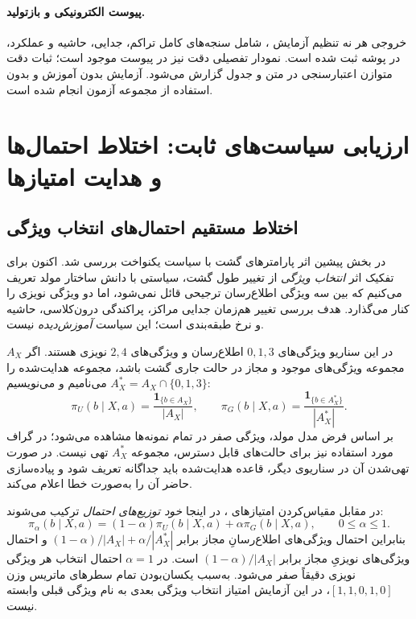 \paragraph{پیوست الکترونیکی و بازتولید.}
خروجی هر نه تنظیم آزمایش ، شامل سنجه‌های کامل تراکم، جدایی، حاشیه و عملکرد، در پوشه  ثبت شده است. نمودار تفصیلی دقت نیز در پیوست موجود است؛ ثبات دقت متوازن اعتبارسنجی در متن و جدول گزارش می‌شود. آزمایش بدون آموزش و بدون استفاده از مجموعه آزمون انجام شده است.

\section{ارزیابی سیاست‌های ثابت: اختلاط احتمال‌ها و هدایت امتیازها}
\label{sec:ch4-fixed-policy-evaluation}
\label{sec:ch4-guided-policy-comparison}

\subsection{اختلاط مستقیم احتمال‌های انتخاب ویژگی}
\label{subsec:ch4-informative-uniform-policy}
در بخش پیشین اثر پارامترهای گشت با سیاست یکنواخت
بررسی شد. اکنون برای تفکیک اثر \emph{انتخاب ویژگی}
از تغییر طول گشت، سیاستی با دانش ساختار مولد تعریف
می‌کنیم که بین سه ویژگی اطلاع‌رسان ترجیحی قائل
نمی‌شود، اما دو ویژگی نویزی را کنار می‌گذارد.
هدف بررسی تغییر هم‌زمان جدایی مراکز، پراکندگی
درون‌کلاسی، حاشیه و نرخ طبقه‌بندی است؛
این سیاست \emph{آموزش‌دیده} نیست.

در این سناریو ویژگی‌های $0,1,3$ اطلاع‌رسان و
ویژگی‌های $2,4$ نویزی هستند. اگر
$A_X$ مجموعه ویژگی‌های موجود و مجاز
در حالت جاری گشت باشد، مجموعه هدایت‌شده را
$A_X^*=A_X\cap\{0,1,3\}$ می‌نامیم و می‌نویسیم:
\begin{equation}\label{eq:ch4-guided-noise-free-policy}
\pi_U(b\mid X,a)=
\frac{\mathbf1_{\{b\in A_X\}}}{|A_X|},
\qquad
\pi_G(b\mid X,a)=
\frac{\mathbf1_{\{b\in A_X^*\}}}{|A_X^*|}.
\end{equation}
بر اساس فرض مدل مولد، ویژگی صفر در تمام نمونه‌ها
مشاهده می‌شود؛ در گراف مورد استفاده نیز
برای حالت‌های قابل دسترس، مجموعه $A_X^*$
تهی نیست. در صورت تهی‌شدن آن در سناریوی دیگر،
قاعده هدایت‌شده باید جداگانه تعریف شود و
پیاده‌سازی حاضر آن را به‌صورت خطا اعلام می‌کند.

در مقابل مقیاس‌کردن امتیازهای ،
در اینجا \emph{خود توزیع‌های احتمال} ترکیب
می‌شوند:
\begin{equation}\label{eq:ch4-guided-probability-mixture}
\pi_\alpha(b\mid X,a)=
(1-\alpha)\pi_U(b\mid X,a)
+\alpha\pi_G(b\mid X,a),
\qquad 0\leq\alpha\leq1.
\end{equation}
بنابراین احتمال ویژگی‌های اطلاع‌رسانِ مجاز برابر
$(1-\alpha)/|A_X|+\alpha/|A_X^*|$
و احتمال ویژگی‌های نویزیِ مجاز برابر
$(1-\alpha)/|A_X|$ است. در $\alpha=1$
احتمال انتخاب هر ویژگی نویزی دقیقاً صفر می‌شود.
به‌سبب یکسان‌بودن تمام سطرهای ماتریس وزن
$[1,1,0,1,0]$، در این آزمایش امتیاز انتخاب
ویژگی بعدی به نام ویژگی قبلی وابسته نیست.

